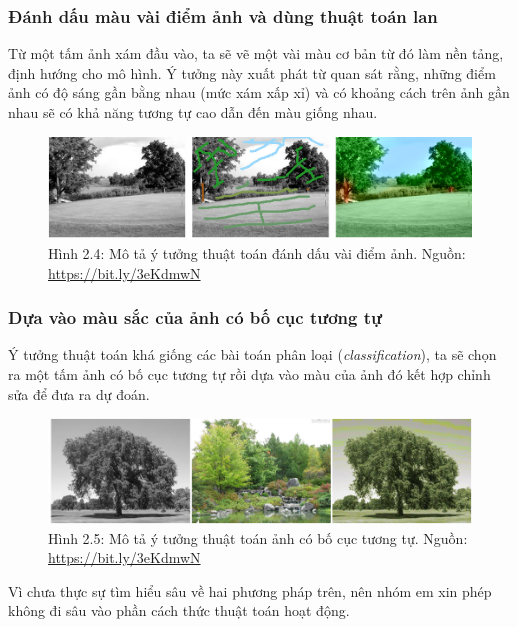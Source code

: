 \documentclass[a4paper]{article}
\begin{document}
\subsubsection{Đánh dấu màu vài điểm ảnh và dùng thuật toán lan}
Từ một tấm ảnh xám đầu vào, ta sẽ vẽ một vài màu cơ bản từ đó làm nền tảng, định hướng cho mô hình. Ý tưởng này xuất phát từ quan sát rằng, những điểm ảnh có độ sáng gần bằng nhau (mức xám xấp xỉ) và có khoảng cách trên ảnh gần nhau sẽ có khả năng tương tự cao dẫn đến màu giống nhau.

\begin{figure}[h!]
\centering
\includegraphics[width=15cm]{images/2_4.png}
\caption{Hình 2.4: Mô tả ý tưởng thuật toán đánh dấu vài điểm ảnh. Nguồn: \href{https://bit.ly/3eKdmwN}{https://bit.ly/3eKdmwN}}
\end{figure}

\subsubsection{Dựa vào màu sắc của ảnh có bố cục tương tự}
Ý tưởng thuật toán khá giống các bài toán phân loại (\textit{classification}), ta sẽ chọn ra một tấm ảnh có bố cục tương tự rồi dựa vào màu của ảnh đó kết hợp chỉnh sửa để đưa ra dự đoán.

\begin{figure}[h!]
\centering
\includegraphics[width=15cm]{images/2_5.png}
\caption{Hình 2.5: Mô tả ý tưởng thuật toán ảnh có bố cục tương tự. Nguồn: \href{https://bit.ly/3eKdmwN}{https://bit.ly/3eKdmwN}}
\end{figure}

\noindent
Vì chưa thực sự tìm hiểu sâu về hai phương pháp trên, nên nhóm em xin phép không đi sâu vào phần cách thức thuật toán hoạt động.
\end{document}
